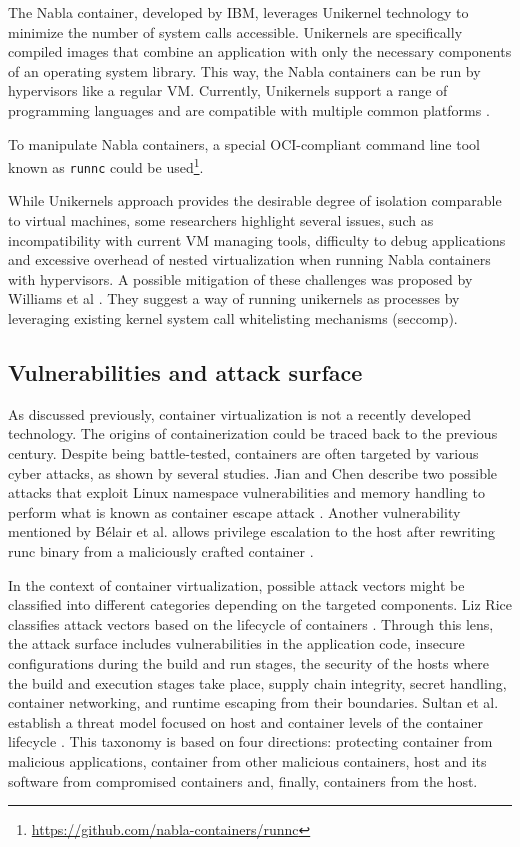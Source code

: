 The Nabla container, developed by IBM, leverages Unikernel technology to minimize the number of system calls accessible. Unikernels are specifically compiled images that combine an application with only the necessary components of an operating system library. This way, the Nabla containers can be run by hypervisors like a regular VM. Currently, Unikernels support a range of programming languages and are compatible with multiple common platforms \cite{acm:4}.

To manipulate Nabla containers, a special OCI-compliant command line tool known as \texttt{runnc} could be used\footnote{\url{https://github.com/nabla-containers/runnc}}.

While Unikernels approach provides the desirable degree of isolation comparable to virtual machines, some researchers highlight several issues, such as incompatibility with current VM managing tools, difficulty to debug applications and excessive overhead of nested virtualization when running Nabla containers with hypervisors. A possible mitigation of these challenges was proposed by Williams et al \cite{acm:4}. They suggest a way of running unikernels as processes by leveraging existing kernel system call whitelisting mechanisms (seccomp).


\clearpage
\subsection{Vulnerabilities and attack surface}

As discussed previously, container virtualization is not a recently developed technology. The origins of containerization could be traced back to the previous century. Despite being battle-tested, containers are often targeted by various cyber attacks, as shown by several studies. Jian and Chen describe two possible attacks that exploit Linux namespace vulnerabilities and memory handling to perform what is known as container escape attack \cite{acm:5}. Another vulnerability mentioned by Bélair et al. allows privilege escalation to the host after rewriting runc binary from a maliciously crafted container \cite{acm:6}.

In the context of container virtualization, possible attack vectors might be classified into different categories depending on the targeted components. Liz Rice classifies attack vectors based on the lifecycle of containers \cite{book:rice}. Through this lens, the attack surface includes vulnerabilities in the application code, insecure configurations during the build and run stages, the security of the hosts where the build and execution stages take place, supply chain integrity, secret handling, container networking, and runtime escaping from their boundaries. Sultan et al. establish a threat model focused on host and container levels of the container lifecycle \cite{ieee:1}. This taxonomy is based on four directions: protecting container from malicious applications, container from other malicious containers, host and its software from compromised containers and, finally, containers from the host.

